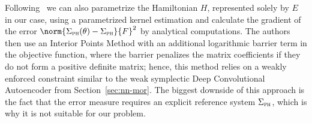 Following~\cite{Najnudel2021} we can also parametrize the Hamiltonian $H$, represented solely by $E$ in our case, using a parametrized kernel estimation and calculate the gradient of the error $\norm{\Sigma_\msc{ph}(\theta) - \Sigma_\msc{ph}}{F}^2$ by analytical computations.
The authors then use an Interior Points Method with an additional logarithmic barrier term in the objective function, where the barrier penalizes the matrix coefficients if they do not form a positive definite matrix; hence, this method relies on a weakly enforced constraint similar to the weak symplectic Deep Convolutional Autoencoder from Section~\ref{sec:nn-mor}.
The biggest downside of this approach is the fact that the error measure requires an explicit reference system $\Sigma_{\textnormal{\scshape ph}}$, which is why it is not suitable for our problem.

